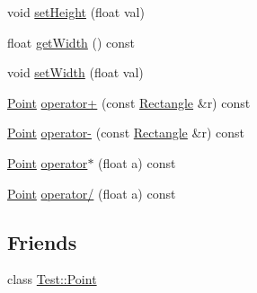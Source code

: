 \begin{DoxyCompactItemize}
\item 
void \hyperlink{class_test_1_1_rectangle_a527e8592ea3d51d3108164a9dc9c098e}{set\+Height} (float val)
\item 
float \hyperlink{class_test_1_1_rectangle_a677e271f31b87c029c0a4bd6f75db2b9}{get\+Width} () const 
\item 
void \hyperlink{class_test_1_1_rectangle_a1a653f2c6fdc1c802d66e7d394b49073}{set\+Width} (float val)
\item 
\hyperlink{class_test_1_1_point}{Point} \hyperlink{class_test_1_1_rectangle_a9fa7c219e58fbbbfd2d6fdd9a9982eac}{operator+} (const \hyperlink{class_test_1_1_rectangle}{Rectangle} \&r) const 
\item 
\hyperlink{class_test_1_1_point}{Point} \hyperlink{class_test_1_1_rectangle_ad0ff2a1c01dcf8da787abf5db07dd084}{operator-\/} (const \hyperlink{class_test_1_1_rectangle}{Rectangle} \&r) const 
\item 
\hyperlink{class_test_1_1_point}{Point} \hyperlink{class_test_1_1_rectangle_a987710115a40cea90c34c47913426117}{operator$\ast$} (float a) const 
\item 
\hyperlink{class_test_1_1_point}{Point} \hyperlink{class_test_1_1_rectangle_ae71ade86e2ae12f96bca1f6c5f0a6a43}{operator/} (float a) const 
\end{DoxyCompactItemize}
\subsection*{Friends}
\begin{DoxyCompactItemize}
\item 
class \hyperlink{class_test_1_1_rectangle_af8dc65e16ce35d928d276a90f6a2523d}{Test\+::\+Point}
\end{DoxyCompactItemize}


